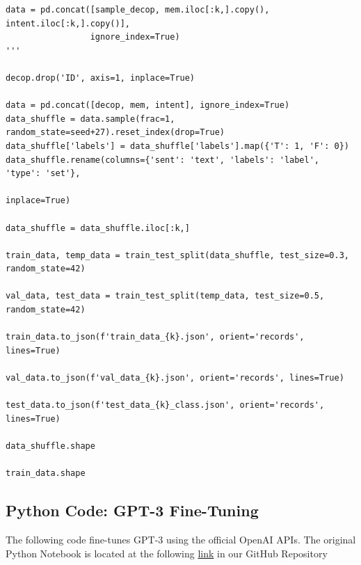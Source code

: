 \documentclass[10pt,twocolumn,letterpaper]{article}
\begin{document}
\begin{verbatim}
data = pd.concat([sample_decop, mem.iloc[:k,].copy(), intent.iloc[:k,].copy()],
                 ignore_index=True)
'''

decop.drop('ID', axis=1, inplace=True)

data = pd.concat([decop, mem, intent], ignore_index=True)
data_shuffle = data.sample(frac=1, random_state=seed+27).reset_index(drop=True)
data_shuffle['labels'] = data_shuffle['labels'].map({'T': 1, 'F': 0})
data_shuffle.rename(columns={'sent': 'text', 'labels': 'label', 'type': 'set'}, 
                                                                        inplace=True)

data_shuffle = data_shuffle.iloc[:k,]

train_data, temp_data = train_test_split(data_shuffle, test_size=0.3, random_state=42)

val_data, test_data = train_test_split(temp_data, test_size=0.5, random_state=42)

train_data.to_json(f'train_data_{k}.json', orient='records', lines=True)

val_data.to_json(f'val_data_{k}.json', orient='records', lines=True)

test_data.to_json(f'test_data_{k}_class.json', orient='records', lines=True)

data_shuffle.shape

train_data.shape
\end{verbatim}

\subsection{Python Code: GPT-3 Fine-Tuning}

The following code fine-tunes GPT-3 using the official OpenAI APIs.
The original Python Notebook is located at the following \href{https://colab.research.google.com/github/TannerAGraves/GPT-LieDetection/blob/main/gpt3.5/API_scratch.ipynb}{link} in our GitHub Repository
\end{document}
